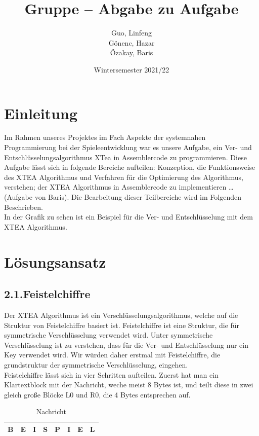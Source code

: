 \documentclass[course=asp]{aspdoc}
\author{Guo, Linfeng\\Gönenc, Hazar \\Özakay, Baris}
\date{Wintersemester 2021/22}
\title{Gruppe \theGroup{} -- Abgabe zu Aufgabe \theNumber}
\begin{document}
\maketitle



\section{Einleitung}
Im Rahmen unseres Projektes im Fach Aspekte der systemnahen Programmierung bei der Spieleentwicklung war es unsere Aufgabe, ein Ver- und Entschlüsselungsalgorithmus XTea in Assemblercode zu programmieren. Diese Aufgabe lässt sich in folgende Bereiche aufteilen: Konzeption, die Funktionsweise des XTEA Algorithmus und Verfahren für die Optimierung des Algorithmus, verstehen; der XTEA Algorithmus in Assemblercode zu implementieren …(Aufgabe von Baris). Die Bearbeitung dieser Teilbereiche wird im Folgenden Beschrieben.  \\In der Grafik zu sehen ist ein Beispiel für die Ver- und Entschlüsselung mit dem XTEA Algorithmus.  

\newpage
\section{Lösungsansatz}
\subsection*{2.1.Feistelchiffre }
Der XTEA Algorithmus ist ein Verschlüsselungsalgorithmus, welche auf die Struktur von Feistelchiffre basiert ist. Feistelchiffre ist eine Struktur, die für symmetrische Verschlüsselung verwendet wird. Unter symmetrische Verschlüsselung ist zu verstehen, dass für die Ver- und Entschlüsselung nur ein Key verwendet wird. Wir würden daher erstmal mit Feistelchiffre, die grundstruktur der symmetrische Verschlüsselung, eingehen.\\
Feistelchiffre lässt sich in vier Schritten aufteilen. Zuerst hat man ein Klartextblock mit der Nachricht, weche meist 8 Bytes ist, und teilt diese in zwei gleich große Bl\"ocke L0 und R0, die 4 Bytes entsprechen auf.

\begin{table}[H]
\centering 
    \begin{tabular}{|l|l|l|l|l|l|l|l|}
        \hline
        B & E & I & S & P & I & E & L   \\
        \hline
    \end{tabular}
    \caption{Nachricht}
\end{table}
\end{document}
